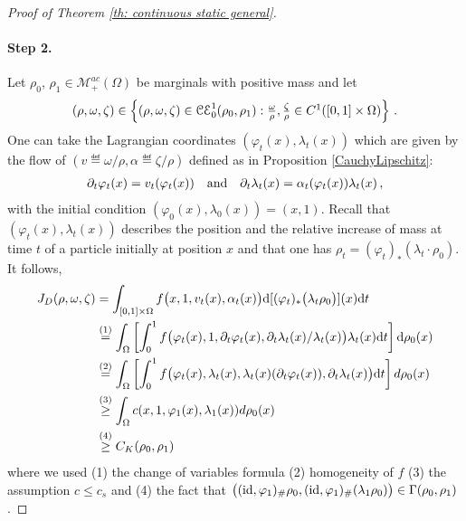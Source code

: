 \begin{proof}[Proof of Theorem \ref{th: continuous static general}]
\paragraph{Step 2.} Let $\rho_0,\, \rho_1 \in  \mathcal{M}_+^{ac}(\Omega)$ be marginals with positive mass and let
\[
(\rho,\omega,\zeta) \in \left\{ (\rho,\omega,\zeta)\in \mathcal{CE}_0^1(\rho_0,\rho_1) : \textstyle{\frac{\omega}{\rho}}, \textstyle{\frac{\zeta}{\rho}}\in C^1([0,1]\times \Omega) \right\} \, .
\]
%
%
One can take the Lagrangian coordinates $(\varphi_t(x),\lambda_t(x))$ which are given by the flow of $(v\eqdef \omega/\rho, \alpha\eqdef \zeta/\rho)$ defined as in Proposition \ref{CauchyLipschitz}:
\begin{align*}
\partial_t \varphi_t(x) = v_t(\varphi_t(x)) \quad \textnormal{and} \quad
\partial_t  \lambda_t(x) = \alpha_t(\varphi_t(x))\lambda_t(x) \, ,
\end{align*}
with the initial condition $(\varphi_0(x), \lambda_0(x)) = (x,1)$. Recall that $(\varphi_t(x),\lambda_t(x))$ describes the position and the relative increase of mass at time $t$ of a particle initially at position $x$ and that one has $\rho_t = (\varphi_t)_{*} (\lambda_t \cdot \rho_0)$.
%
It follows,
\begin{align*}
J_D(\rho,\omega, \zeta) 
&= \int_{[0,1] \times \Omega} f\big(x,1,v_t(x),\alpha_t(x)\big) \mathrm{d}[(\varphi_t)_{*} \big(\lambda_t \rho_0 \big)](x) \mathrm{d} t \\
&\overset{(1)}{=} \int_{\Omega} \left[ \int_0^1 f\big(\varphi_t(x),1, \partial_t \varphi_t(x), \partial_t \lambda_t(x)/\lambda_t(x) \big) \lambda_t(x) \mathrm{d} t \right] \mathrm{d} \rho_0(x) \\
&\overset{(2)}{=}  \int_{\Omega} \left[ \int_0^1 f\big(\varphi_t(x),\lambda_t(x), \lambda_t(x) (\partial_t \varphi_t(x)),\partial_t \lambda_t(x) \big) \mathrm{d} t \right] d \rho_0(x) \\
&\overset{(3)}{\geq} \int_{\Omega} c(x,1, \varphi_1(x), \lambda_1(x)) d \rho_0(x) \\
&\overset{(4)}{\geq}  C_K(\rho_0,\rho_1)
\end{align*}
where we used (1) the change of variables formula (2) homogeneity of $f$ (3) the assumption $c\leq c_s$ and (4) 
the fact that  $\big( (\operatorname{id}, \varphi_1)_{\#} \rho_0, (\operatorname{id}, \varphi_1)_{\#} (\lambda_1 \rho_0)\big)\in \Gamma(\rho_0,\rho_1)$.
%

\end{proof}
